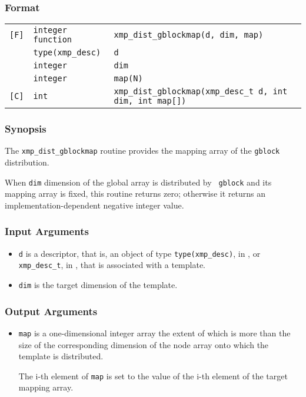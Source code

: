 \subsubsection*{Format}

\begin{tabular}{lll}

\verb![F]!& {\tt integer function}& {\tt xmp\_dist\_gblockmap(d, dim, map)}\\
          & {\tt type(xmp\_desc)} & {\tt d}\\
          & {\tt integer} & {\tt dim}\\
          & {\tt integer} & {\tt map(N)}\\

\verb![C]!&  {\tt int}& {\tt xmp\_dist\_gblockmap(xmp\_desc\_t d, int dim, int map[])}\\

\end{tabular}

\subsubsection*{Synopsis}

The {\tt xmp\_dist\_gblockmap} routine provides the mapping array of the
{\tt gblock} distribution.

When {\tt dim} dimension of the global array is distributed by {\tt
gblock} and its mapping array is fixed, this routine returns zero;
otherwise it returns an implementation-dependent negative integer value.

\subsubsection*{Input Arguments}
\begin{itemize}
 \item {\tt d} is a descriptor, that is, an object of type 
       {\tt type(xmp\_desc)}, in {\XMPF}, or {\tt xmp\_desc\_t},
       in {\XMPC}, that is associated with a template.
 \item {\tt dim} is the target dimension of the template.
\end{itemize}

\subsubsection*{Output Arguments}
\begin{itemize}
 \item {\tt map} is a one-dimensional integer array the extent of which
       is more than the size of the corresponding
       dimension of the node array onto which the template is
       distributed.

       The i-th element of {\tt map} is set to the value of the i-th
       element of the target mapping array.
\end{itemize}


